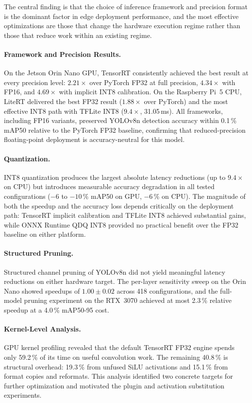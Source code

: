 \documentclass[12pt,a4paper]{report}
\begin{document}
The central finding is that the choice of inference framework and precision format is the dominant factor in
edge deployment performance, and the most effective optimizations are those that change the hardware execution regime
rather than those that reduce work within an existing regime.

\paragraph{Framework and Precision Results.}
On the Jetson Orin Nano GPU, TensorRT consistently achieved the best result at every precision level: $2.21\times$ over
PyTorch FP32 at full precision, $4.34\times$ with FP16, and $4.69\times$ with implicit INT8 calibration.
On the Raspberry Pi~5 CPU, LiteRT delivered the best FP32 result ($1.88\times$ over PyTorch) and the most effective INT8
path with TFLite INT8 ($9.4\times$, 31.05\,ms).
All frameworks, including FP16 variants, preserved YOLOv8n detection accuracy within 0.1\,\% mAP50 relative to the
PyTorch FP32 baseline, confirming that reduced-precision floating-point deployment is accuracy-neutral for this model.

\paragraph{Quantization.}
INT8 quantization produces the largest absolute latency reductions (up to $9.4\times$ on CPU) but introduces measurable
accuracy degradation in all tested configurations ($-6$ to $-10\,\%$ mAP50 on GPU, $-6\,\%$ on CPU).
The magnitude of both the speedup and the accuracy loss depends critically on the deployment path: TensorRT implicit
calibration and TFLite INT8 achieved substantial gains, while ONNX Runtime QDQ INT8 provided no practical benefit over
the FP32 baseline on either platform.

\paragraph{Structured Pruning.}
Structured channel pruning of YOLOv8n did not yield meaningful latency reductions on either hardware target.
The per-layer sensitivity sweep on the Orin Nano showed speedups of $1.00\pm0.02$ across 418 configurations, and the
full-model pruning experiment on the RTX~3070 achieved at most 2.3\,\% relative speedup at a 4.0\,\% mAP50-95 cost.

\paragraph{Kernel-Level Analysis.}
GPU kernel profiling revealed that the default TensorRT FP32 engine spends only 59.2\,\% of its time on useful
convolution work.
The remaining 40.8\,\% is structural overhead: 19.3\,\% from unfused SiLU activations and 15.1\,\% from format copies
and reformats.
This analysis identified two concrete targets for further optimization and motivated the plugin and activation
substitution experiments.
\end{document}
